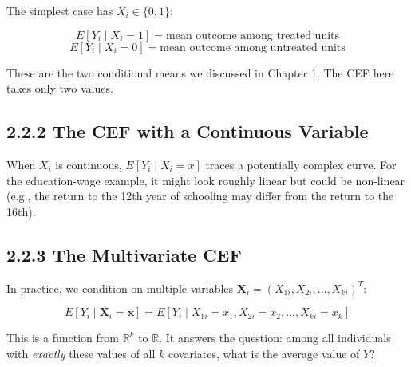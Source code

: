 The simplest case has $X_i \in \{0, 1\}$:

\[
E[Y_i \mid X_i = 1] = \text{mean outcome among treated units}
\]
\[
E[Y_i \mid X_i = 0] = \text{mean outcome among untreated units}
\]

These are the two conditional means we discussed in Chapter 1. The CEF here takes only two values.

\subsection{2.2.2 The CEF with a Continuous Variable}

When $X_i$ is continuous, $E[Y_i \mid X_i = x]$ traces a potentially complex curve. For the education-wage example, it might look roughly linear but could be non-linear (e.g., the return to the 12th year of schooling may differ from the return to the 16th).

\subsection{2.2.3 The Multivariate CEF}

In practice, we condition on multiple variables $\mathbf{X}_i = (X_{1i}, X_{2i}, \ldots, X_{ki})^T$:

\[
E[Y_i \mid \mathbf{X}_i = \mathbf{x}] = E\left[Y_i \mid X_{1i} = x_1, X_{2i} = x_2, \ldots, X_{ki} = x_k\right]
\]

This is a function from $\mathbb{R}^k$ to $\mathbb{R}$. It answers the question: among all individuals with \textit{exactly} these values of all $k$ covariates, what is the average value of $Y$?

